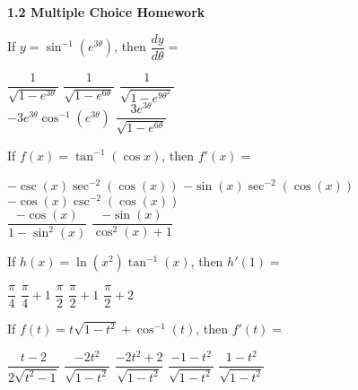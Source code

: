 \textbf{\large{1.2 Multiple Choice Homework}} \par

\begin{questions}
    \question If $y = \sin^{-1} \left(e^{3\theta}\right)$, then $\dfrac{dy}{d\theta} = $ \\

    \begin{oneparchoices}
        \choice $\dfrac{1}{\sqrt{1 - e^{3\theta}}}$
        \choice $\dfrac{1}{\sqrt{1 - e^{6\theta}}}$
        \choice $\dfrac{1}{\sqrt{1 - e^{9\theta^2}}}$ \\[11pt]
        \makebox[0.2 \textwidth] \choice $-3e^{3\theta}\cos^{-1} \left(e^{3\theta}\right)$ 
        \makebox[0.25 \textwidth] \choice $\dfrac{3e^{3\theta}}{\sqrt{1 - e^{6\theta}}}$
    \end{oneparchoices} \par \horizontalline

    \question If $f(x) = \tan^{-1}(\cos x)$, then $f'(x) = $ \\

    \begin{oneparchoices}
        \choice $-\csc (x)\sec^{-2} (\cos (x))$
        \choice $-\sin (x)\sec^{-2} (\cos (x))$
        \choice $-\cos (x)\csc^{-2} (\cos (x))$ \\[11pt] 
        \makebox[0.23 \textwidth] \choice $\dfrac{-\cos (x)}{1 - \sin^2(x)}$
        \makebox[0.25 \textwidth] \choice $\dfrac{-\sin (x)}{\cos^2 (x) + 1}$
    \end{oneparchoices} \par \horizontalline

    \question If $h(x) = \ln \left(x^2\right)\tan^{-1} (x)$, then $h'(1) = $ \\

    \begin{oneparchoices}
        \choice $\dfrac{\pi}{4}$
        \choice $\dfrac{\pi}{4} + 1$
        \choice $\dfrac{\pi}{2}$
        \choice $\dfrac{\pi}{2} + 1$
        \choice $\dfrac{\pi}{2} + 2$
    \end{oneparchoices} \par \horizontalline

    \question If $f(t) = t\sqrt{1 - t^2} + \cos^{-1} (t)$, then $f'(t) = $ \\

    \begin{oneparchoices}
        \choice $\dfrac{t - 2}{2\sqrt{t^2 - 1}}$
        \choice $\dfrac{-2t^2}{\sqrt{1 - t^2}}$
        \choice $\dfrac{-2t^2 + 2}{\sqrt{1 - t^2}}$
        \choice $\dfrac{-1 - t^2}{\sqrt{1 - t^2}}$
        \choice $\dfrac{1 - t^2}{\sqrt{1 - t^2}}$
    \end{oneparchoices} \par \horizontalline


\end{questions}
